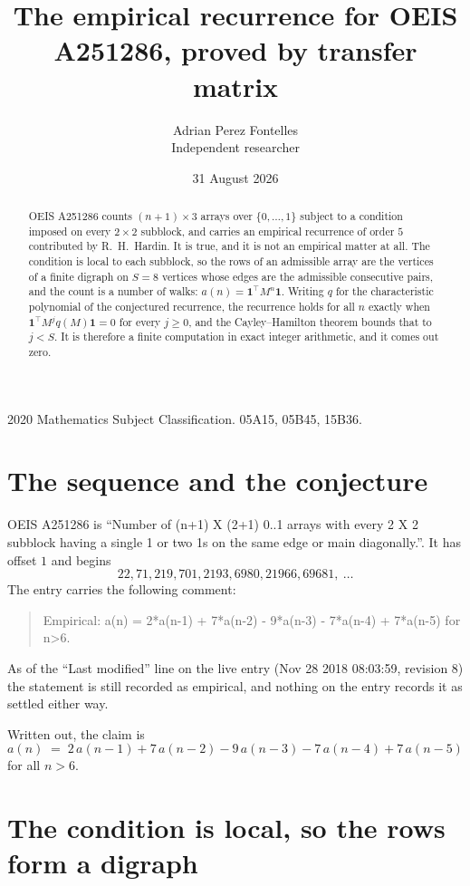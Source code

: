 \documentclass[11pt,a4paper]{article}
\title{The empirical recurrence for OEIS A251286, proved by transfer matrix}
\author{Adrian Perez Fontelles\\ \small Independent researcher}
\date{31 August 2026}
\theoremstyle{plain}
\theoremstyle{definition}
\begin{document}
\maketitle

\begin{abstract}
OEIS A251286 counts $(n+1)\times3$ arrays over $\{0,\dots,1\}$ subject to a condition imposed on
every $2\times2$ subblock, and carries an empirical recurrence of order $5$ contributed
by R.~H.~Hardin. It is true, and it is not an empirical matter at all. The condition is local
to each subblock, so the rows of an admissible array are the vertices of a finite digraph
on $S=8$ vertices whose edges are the admissible consecutive pairs, and the count is a
number of walks: $a(n)=\mathbf{1}^{\!\top}M^{n}\mathbf{1}$. Writing $q$
for the characteristic polynomial of the conjectured recurrence, the recurrence holds for all
$n$ exactly when $\mathbf{1}^{\!\top}M^{j}q(M)\mathbf{1}=0$ for every $j\ge0$, and the
Cayley--Hamilton theorem bounds that to $j<S$. It is therefore a finite computation in exact
integer arithmetic, and it comes out zero.
\end{abstract}

\noindent\small 2020 Mathematics Subject Classification. 05A15, 05B45, 15B36.\normalsize

\section{The sequence and the conjecture}

OEIS A251286 is ``Number of (n+1) X (2+1) 0..1 arrays with every 2 X 2 subblock having a single 1 or two 1s on the same edge or main diagonally.''. It has offset $1$ and begins
\[
22, 71, 219, 701, 2193, 6980, 21966, 69681,\ \dots
\]
The entry carries the following comment:
\begin{quote}\small
Empirical: a(n) = 2*a(n-1) + 7*a(n-2) - 9*a(n-3) - 7*a(n-4) + 7*a(n-5) for n>6.
\end{quote}
As of the ``Last modified'' line on the live entry (Nov 28 2018 08:03:59, revision 8) the statement is
still recorded as empirical, and nothing on the entry records it as settled either way.

Written out, the claim is
\begin{equation}\label{eq:conj}
a(n)\;=\;2\,a(n-1) + 7\,a(n-2) - 9\,a(n-3) - 7\,a(n-4) + 7\,a(n-5)
\end{equation}
for all $n>6$.

\section{The condition is local, so the rows form a digraph}
\end{document}
